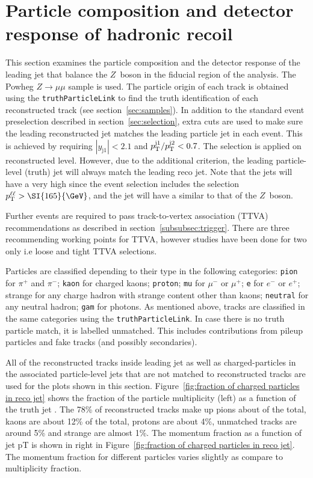 \section{Particle composition and detector response of hadronic recoil}

This section examines the particle composition and the detector response of the leading jet that balance the $Z$~boson in the fiducial region of the analysis.
The Powheg $Z\to \mu\mu$ sample is used. The particle origin of each track is obtained using the \texttt{truthParticleLink} to find the truth identification of each reconstructed track (see section~\ref{sec:samples}). In addition to the standard event preselection described in section~\ref{sec:selection}, extra cuts are used to make sure the leading reconstructed jet matches the leading particle jet in each event.
This is achieved by requiring $|y_\mathrm{j1}|<2.1$ and $p_\mathrm{T}^{\mathrm{j1}} / p_\mathrm{T}^{\mathrm{j2}} < 0.7$. The selection is applied on reconstructed level. However, due to the additional criterion, the leading particle-level (truth) jet will always match the leading reco jet. Note that the jets will have a very high \pt{} since the event selection includes the selection $\pTll > \SI{165}{\GeV}$, and the jet will have a similar \pt{} to that of the $Z$~boson. 

Further events are required to pass track-to-vertex association (TTVA) recommendations as described in section~\ref{subsubsec:trigger}. There are three recommending working points for TTVA, however studies have been done for two only i.e loose and tight TTVA selections.  

Particles are classified depending to their type in the following categories: \texttt{pion} for $\pi^+$ and $\pi^-$; \texttt{kaon} for charged kaons; \texttt{proton};
\texttt{mu} for $\mu^-$ or $\mu^+$; \texttt{e} for $e^-$ or $e^+$;
strange for any charge hadron with strange content other than kaons; \texttt{neutral} for any neutral hadron; \texttt{gam} for photons. As mentioned above, tracks are classified in the same categories using the \texttt{truthParticleLink}. In case there is no truth particle match, it is labelled unmatched. This includes contributions from pileup particles and fake tracks (and possibly secondaries).


All of the reconstructed tracks inside leading jet as well as charged-particles in the associated particle-level jets that are not matched to reconstructed tracks are used for the plots shown in this section. Figure~\ref{fig:fraction of charged particles in reco jet} shows the fraction of the particle multiplicity (left) as a function of the truth jet \pT. The 78\% of reconstructed tracks make up pions about of the total, kaons are about 12\% of the total, protons are about 4\%, unmatched tracks are around 5\% and strange are almost 1\%. The momentum fraction as a function of jet pT is shown in right in Figure~\ref{fig:fraction of charged particles in reco jet}. The momentum fraction for different particles varies slightly as compare to multiplicity fraction.

